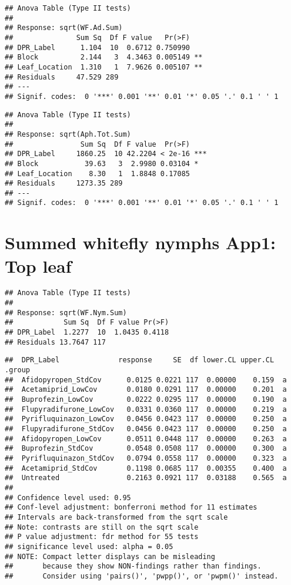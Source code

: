 \documentclass[
]{article}
\begin{document}
\begin{verbatim}
## Anova Table (Type II tests)
## 
## Response: sqrt(WF.Ad.Sum)
##               Sum Sq  Df F value   Pr(>F)   
## DPR_Label      1.104  10  0.6712 0.750990   
## Block          2.144   3  4.3463 0.005149 **
## Leaf_Location  1.310   1  7.9626 0.005107 **
## Residuals     47.529 289                    
## ---
## Signif. codes:  0 '***' 0.001 '**' 0.01 '*' 0.05 '.' 0.1 ' ' 1
\end{verbatim}

\begin{verbatim}
## Anova Table (Type II tests)
## 
## Response: sqrt(Aph.Tot.Sum)
##                Sum Sq  Df F value  Pr(>F)    
## DPR_Label     1860.25  10 42.2204 < 2e-16 ***
## Block           39.63   3  2.9980 0.03104 *  
## Leaf_Location    8.30   1  1.8848 0.17085    
## Residuals     1273.35 289                    
## ---
## Signif. codes:  0 '***' 0.001 '**' 0.01 '*' 0.05 '.' 0.1 ' ' 1
\end{verbatim}

\hypertarget{summed-whitefly-nymphs-app1-top-leaf}{%
\section{Summed whitefly nymphs App1: Top
leaf}\label{summed-whitefly-nymphs-app1-top-leaf}}

\begin{verbatim}
## Anova Table (Type II tests)
## 
## Response: sqrt(WF.Nym.Sum)
##            Sum Sq  Df F value Pr(>F)
## DPR_Label  1.2277  10  1.0435 0.4118
## Residuals 13.7647 117
\end{verbatim}

\begin{verbatim}
##  DPR_Label              response     SE  df lower.CL upper.CL .group
##  Afidopyropen_StdCov      0.0125 0.0221 117  0.00000    0.159  a    
##  Acetamiprid_LowCov       0.0180 0.0291 117  0.00000    0.201  a    
##  Buprofezin_LowCov        0.0222 0.0295 117  0.00000    0.190  a    
##  Flupyradifurone_LowCov   0.0331 0.0360 117  0.00000    0.219  a    
##  Pyrifluquinazon_LowCov   0.0456 0.0423 117  0.00000    0.250  a    
##  Flupyradifurone_StdCov   0.0456 0.0423 117  0.00000    0.250  a    
##  Afidopyropen_LowCov      0.0511 0.0448 117  0.00000    0.263  a    
##  Buprofezin_StdCov        0.0548 0.0508 117  0.00000    0.300  a    
##  Pyrifluquinazon_StdCov   0.0794 0.0558 117  0.00000    0.323  a    
##  Acetamiprid_StdCov       0.1198 0.0685 117  0.00355    0.400  a    
##  Untreated                0.2163 0.0921 117  0.03188    0.565  a    
## 
## Confidence level used: 0.95 
## Conf-level adjustment: bonferroni method for 11 estimates 
## Intervals are back-transformed from the sqrt scale 
## Note: contrasts are still on the sqrt scale 
## P value adjustment: fdr method for 55 tests 
## significance level used: alpha = 0.05 
## NOTE: Compact letter displays can be misleading
##       because they show NON-findings rather than findings.
##       Consider using 'pairs()', 'pwpp()', or 'pwpm()' instead.
\end{verbatim}
\end{document}
